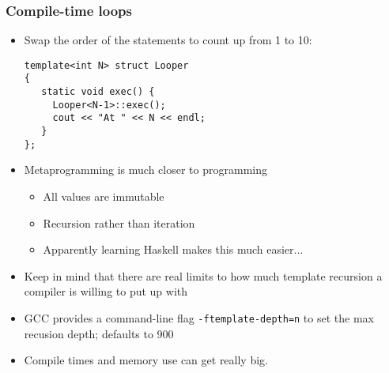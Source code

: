 
\begin{frame}[fragile,t]
\frametitle{Compile-time loops}
\begin{itemize}[<+->]
\item Swap the order of the statements to count up from 1 to 10:
{\scriptsize\begin{verbatim}
template<int N> struct Looper
{
   static void exec() {
     Looper<N-1>::exec();
     cout << "At " << N << endl;
   }
};
\end{verbatim}
}

\item Metaprogramming is much closer to  programming
  \begin{itemize}[<+->]
  \item All values are immutable
  \item Recursion rather than iteration
  \item Apparently learning Haskell makes this much easier...
  \end{itemize}
\vskip 12pt
\item Keep in mind that there are real limits to how much template
  recursion a compiler is willing to put up with
\item GCC provides a command-line flag \texttt{-ftemplate-depth=n} to
  set the max recusion depth; defaults to 900
\item Compile times and memory use can get really big.
\end{itemize}

\end{frame}
